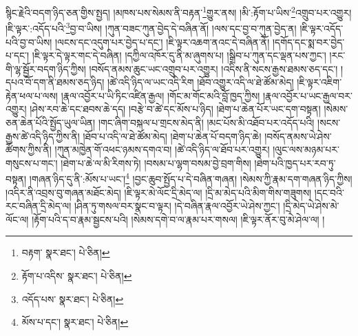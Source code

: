 སྙིང་རྗེའི་བདག་ཉིད་ཅན་གྱིས་སྤྱད། །མཁས་པས་སེམས་ནི་བརྟན་\footnote{བརྟག་  སྣར་ཐང་།  པེ་ཅིན། }གྱུར་ནས། །མི་:རྟོག་པ་ཡིས་\footnote{རྟོག་པ་འདིས་  སྣར་ཐང་།  པེ་ཅིན། }འགྲུབ་པར་འགྱུར། །ཇི་ལྟར་:འདོད་པའི་\footnote{འདོད་པས་  སྣར་ཐང་།  པེ་ཅིན། }བྱ་བ་ཡིས། །ཀུན་བཟང་ཀུན་བྱེད་དེ་བཞིན་ནོ། །ལས་དང་བྱ་བ་ཀུན་བྱེད་ན། །ཇི་ལྟར་འདོད་པའི་བྱ་བ་ཡིས། །ལངས་དང་འདུག་པར་བྱེད་པ་དང་། །ཇི་ལྟར་འཆག་ནའང་དེ་བཞིན་ནོ། །དགོད་དང་སྨ་བར་བྱེད་པ་དང་། །ཇི་ལྟར་དེ་ལྟར་གང་དེ་བཞིན། །དཀྱིལ་འཁོར་དུ་ནི་མ་ཞུགས་པ། །སྒྲིབ་པ་ཀུན་དང་ལྡན་པས་ཀྱང་། །རང་གི་ལྷ་སྦྱོར་བདག་ཉིད་ཀྱིས། །བསོད་ནམས་ཆུང་ཡང་འགྲུབ་པར་འགྱུར། །འདིས་ནི་སངས་རྒྱས་ཐམས་ཅད་དང་། །དཔའ་བོ་དག་ནི་ཐམས་ཅད་ཉིད། །ཚེ་འདི་ཉིད་ལ་ཡང་འདི་རིག །ཐོབ་འགྱུར་འདི་ལ་ཐེ་ཚོམ་མེད། །ཇི་ལྟར་འཇིག་རྟེན་ཕལ་པ་ལས། །རྣལ་འབྱོར་པ་ཡི་ཏིང་འཛིན་རྒྱལ། །གོང་མ་གོང་མའི་བློ་ཁྱད་ཀྱིས། །རྣལ་འབྱོར་པ་ཡང་རྒྱལ་བར་འགྱུར། །ཤེས་རབ་ཆེ་དང་ཐབས་ཆེ་དད། །བརྩེ་བ་ཚེ་དང་མོས་པ་ཉིད། །ཐེག་པ་ཆེན་པོར་ཡང་དག་བསྟན། །སེམས་ཅན་ཆེན་པོའི་སྤྱོད་ཡུལ་ཡིན། །གང་ཞིག་བསྐལ་པ་གྲངས་མེད་ནི། །མང་པོས་མི་འཐོབ་པར་འདོད་པའི། །སངས་རྒྱས་ཚེ་འདི་ཉིད་ཀྱིས་ནི། །ཐོབ་པ་འདི་ལ་ཐེ་ཚོམ་མེད། །ཐེག་པ་ཆེན་པོ་བདག་ཉིད་ཆེ། །བསོད་ནམས་ཡེ་ཤེས་ཚོགས་ཀྱིས་ནི། །ཀུན་མཁྱེན་གོ་འཕང་ཉམས་དགའ་བ། །ཚེ་འདི་ཉིད་ལ་ཐོབ་པར་འགྱུར། །ལུང་ལས་མཉམ་པར་གསུངས་པ་གང་། །ཐེག་པ་ཆེ་ལ་མི་རིགས་ཏེ། །བསམ་པ་ལྷག་བསམ་བྱེ་བྲག་གིས། །ཐེག་པའི་ཁྱད་པར་རབ་ཏུ་བསྟན། །གཞན་ཉིད་དུ་ནི་:མོས་པ་ཡང་།\footnote{མོས་པ་དང་།  སྣར་ཐང་།  པེ་ཅིན། } །བྱང་ཆུབ་སྤྱོད་པ་དེ་བཞིན་གཞན། །སེམས་ཀྱི་རྣམ་དག་གཞན་ཉིད་ཀྱིས། །འདིར་ནི་འབྲས་བུ་གཞན་མཐོང་མེད། །ཇི་ལྟར་མེ་ལོང་དྲི་མེད་ལ། །དྲི་མ་མེད་པའི་མིག་གིས་གཟུགས། །དང་བའི་རང་བཞིན་དྲི་མེད་ལ། །ཤིན་ཏུ་གསལ་བར་སྣང་བ་ལྟར། །དེ་བཞིན་རྣལ་འབྱོར་ཡེ་ཤེས་ཀྱང་། །དྲི་མེད་ཡེ་ཤེས་མེ་ལོང་ལ། །རྟོག་པའི་ད་བ་རྣམ་སྦྱངས་པའི། །སེམས་དགེ་བ་ལ་རྣམ་པར་གསལ། །ཇི་ལྟར་ནོར་བུ་མེ་ཤེལ་ལ། །
